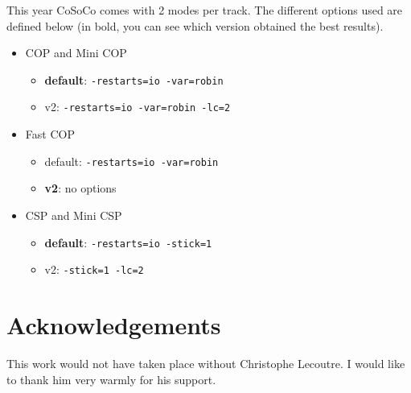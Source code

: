 \documentclass{llncs}
\begin{document}
    \medskip
    This year CoSoCo comes with 2 modes per track. The different options used are defined below (in bold, you can see which version obtained the best results).

    \begin{itemize}
        \item     COP and Mini COP
        \begin{itemize}
            \item   {\bf default}: {\tt -restarts=io -var=robin}
            \item v2: {\tt -restarts=io -var=robin -lc=2}
        \end{itemize}
        \item Fast COP
        \begin{itemize}
            \item default: {\tt -restarts=io -var=robin}
            \item {\bf v2}: no options
        \end{itemize}
        \item CSP and Mini CSP
        \begin{itemize}
            \item \textbf{default}: {\tt  -restarts=io -stick=1}
            \item v2: {\tt -stick=1 -lc=2}
        \end{itemize}
    \end{itemize}





    \section*{Acknowledgements}
    This work would not have taken place without Christophe Lecoutre. I would like to thank him very warmly for his support.

    
    
\end{document}
